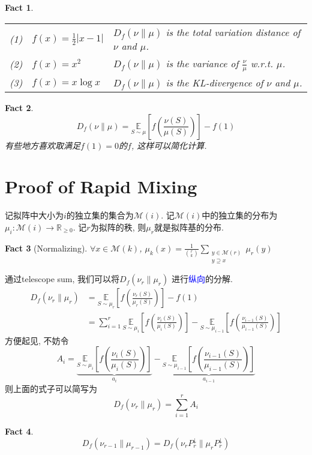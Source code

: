 \documentclass{article}
\newtheorem{fact}{Fact}
\def\~{\sim}
\def\R{\mathbb{R}}
\def\E_#1#2{\underset{#1}{\mathbb{E}}\left[#2\right]}
\begin{document}
\begin{fact} \ \\
  \begin{tabular}{lll}
    (1) & $f(x) = \frac{1}{2}|x-1|$ & $D_f(\nu\parallel\mu)$ is the total variation distance of $\nu$ and $\mu$. \\
    (2) & $f(x) = x^2$ & $D_f(\nu\parallel\mu)$ is the variance of $\frac{\nu}{\mu}$ w.r.t. $\mu$. \\
    (3) & $f(x) = x\log x$ & $D_f(\nu\parallel\mu)$ is the KL-divergence of $\nu$ and $\mu$.
  \end{tabular}
\end{fact}

\begin{fact}
  \[D_f(\nu\parallel\mu) = \E_{S\~\mu}{f(\frac{\nu(S)}{\mu(S)})} - f(1)\]
  有些地方喜欢取满足$f(1) = 0$的$f$, 这样可以简化计算.
\end{fact}

\section{Proof of Rapid Mixing}
记拟阵中大小为$i$的独立集的集合为$\mathcal{M}(i)$.
记$\mathcal{M}(i)$中的独立集的分布为$\mu_i:\mathcal{M}(i)\to\R_{\geq 0}$.
记$r$为拟阵的秩, 则$\mu_r$就是拟阵基的分布.
\begin{fact}[Normalizing]
  $\forall x \in \mathcal{M}(k)$, $\mu_k(x) = \frac{1}{\binom{r}{k}}\sum_{\substack{y\in\mathcal{M}(r)\\y\supseteq x}}\mu_r(y)$
\end{fact}
通过telescope sum, 我们可以将$D_f(\nu_r\parallel \mu_r)$ 进行\textcolor{blue}{纵向}的分解.
\begin{align*}
  D_f(\nu_r \parallel \mu_r)
  &= \E_{S\~\mu_r}{f(\frac{\nu_r(S)}{\mu_r(S)})} - f(1) \\
  &= \sum_{i=1}^r \E_{S\~\mu_i}{f(\frac{\nu_i(S)}{\mu_i(S)})} - \E_{S\~\mu_{i-1}}{f(\frac{\nu_{i-1}(S)}{\mu_{i-1}(S)})}
\end{align*}
方便起见, 不妨令
\[A_i = \underbrace{\E_{S\~\mu_i}{f(\frac{\nu_i(S)}{\mu_i(S)})}}_{a_i} - \underbrace{\E_{S\~\mu_{i-1}}{f(\frac{\nu_{i-1}(S)}{\mu_{i-1}(S)})}}_{a_{i-1}}\]
则上面的式子可以简写为
\[D_f(\nu_r \parallel \mu_r) = \sum_{i=1}^r A_i\]


\begin{fact}
  \[D_f(\nu_{r-1} \parallel \mu_{r-1}) = D_f(\nu_rP_r^\downarrow\parallel\mu_rP_r^\downarrow)\]
\end{fact}
\end{document}
